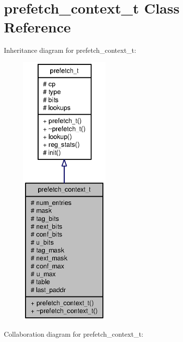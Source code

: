 \section{prefetch\_\-context\_\-t Class Reference}
\label{classprefetch__context__t}
Inheritance diagram for prefetch\_\-context\_\-t:\nopagebreak
\begin{figure}[H]
\begin{center}
\leavevmode
\includegraphics[height=400pt]{classprefetch__context__t__inherit__graph}
\end{center}
\end{figure}
Collaboration diagram for prefetch\_\-context\_\-t:\nopagebreak
